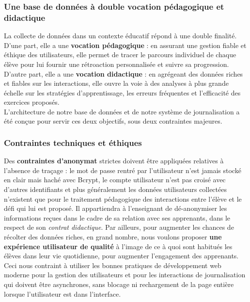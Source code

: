 \documentclass[11pt,a4paper]{article}
\begin{document}
\subsubsection{Une base de données à double vocation pédagogique et didactique}
La collecte de données dans un contexte éducatif répond à une double finalité. D'une part, elle a une \textbf{vocation pédagogique} : en assurant une gestion fiable et éthique des utilisateurs, elle permet de tracer le parcours individuel de chaque élève pour lui fournir une rétroaction personnalisée et suivre sa progression. D'autre part, elle a une \textbf{vocation didactique} : en agrégeant des données riches et fiables sur les interactions, elle ouvre la voie à des analyses à plus grande échelle sur les stratégies d'apprentissage, les erreurs fréquentes et l'efficacité des exercices proposés.\\ 
L'architecture de notre base de données et de notre système de journalisation a été conçue pour servir ces deux objectifs, sous deux contraintes majeures.

\subsubsection{Contraintes techniques et éthiques}
Des \textbf{contraintes d'anonymat} strictes doivent être appliquées relatives à l'absence de traçage : le mot de passe rentré par l'utilisateur n'est jamais stocké en clair mais haché avec Bcrypt, le compte utilisateur n'est pas croisé avec d'autres identifiants et plus généralement les données utilisateurs collectées n'existent que pour le traitement pédagogique des interactions entre l'élève et le défi qui lui est proposé. Il appartiendra à l'enseignant de dé-anonymiser les informations reçues dans le cadre de sa relation avec ses apprenants, dans le respect de son \textit{contrat didactique}. Par ailleurs, pour augmenter les chances de récolter des données riches, en grand nombre, nous voulons proposer \textbf{une expérience utilisateur de qualité} à l'image de ce à quoi sont habitués les élèves dans leur vie quotidienne, pour augmenter l'engagement des apprenants. Ceci nous contraint à utiliser les bonnes pratiques de développement web moderne pour la gestion des utilisateurs et pour les interactions de journalisation qui doivent être asynchrones, sans blocage ni rechargement de la page entière lorsque l'utilisateur est dans l'interface.
\end{document}
